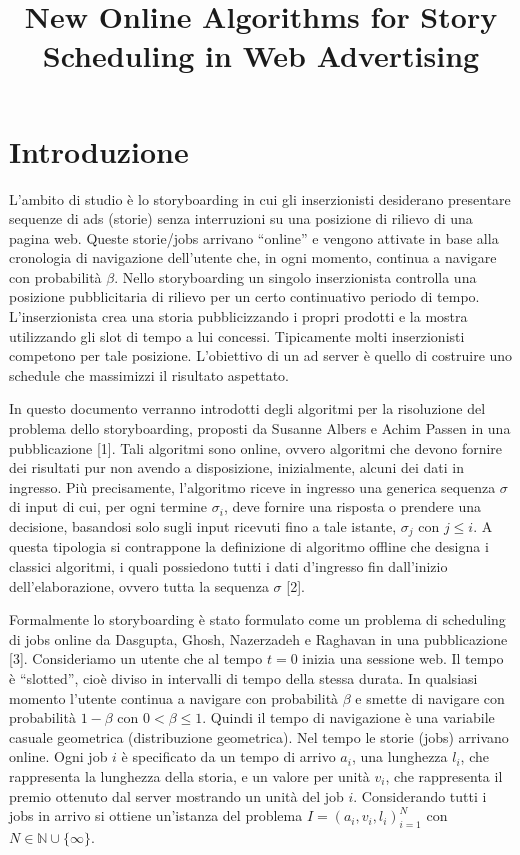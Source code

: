 \documentclass[12pt]{article}
\title{ \LARGE\textbf{New Online Algorithms for Story Scheduling in Web Advertising}}
\date{}
\newcommand*{\N}{\mathbb{N}}
\begin{document}
\maketitle
\section{Introduzione}
L’ambito di studio è lo storyboarding in cui gli inserzionisti desiderano presentare sequenze di ads (storie) senza interruzioni su una posizione di rilievo di una pagina web. Queste storie/jobs arrivano “online” e vengono attivate in base alla cronologia di navigazione dell'utente che, in ogni momento, continua a navigare con probabilità $\beta$. Nello storyboarding un singolo inserzionista controlla una posizione pubblicitaria di rilievo per un certo continuativo periodo di tempo. L’inserzionista crea una storia pubblicizzando i propri prodotti e la mostra utilizzando gli slot di tempo a lui concessi. Tipicamente molti inserzionisti competono per tale posizione. L’obiettivo di un ad server è quello di costruire uno schedule che massimizzi il risultato aspettato. 

In questo documento verranno introdotti degli algoritmi per la risoluzione del problema dello storyboarding, proposti da Susanne Albers e Achim Passen in una pubblicazione [1]. Tali algoritmi sono online, ovvero algoritmi che devono fornire dei risultati pur non avendo a disposizione, inizialmente, alcuni dei dati in ingresso. Più precisamente, l'algoritmo riceve in ingresso una generica sequenza $\sigma$ di input di cui, per ogni termine $\sigma_{i}$, deve fornire una risposta o prendere una decisione, basandosi solo sugli input ricevuti fino a tale istante, $\sigma_{j}$ con $j \leq i$. A questa tipologia si contrappone la definizione di algoritmo offline che designa i classici algoritmi, i quali possiedono tutti i dati d'ingresso fin dall'inizio dell'elaborazione, ovvero tutta la sequenza $\sigma$ [2].

Formalmente lo storyboarding è stato formulato come un problema di scheduling di jobs online da Dasgupta, Ghosh, Nazerzadeh e Raghavan in una pubblicazione [3]. Consideriamo un utente che al tempo $t = 0$ inizia una sessione web. Il tempo è “slotted”, cioè diviso in intervalli di tempo della stessa durata. In qualsiasi momento l’utente continua a navigare con probabilità $\beta$ e smette di navigare con probabilità $1 - \beta$ con $0 < \beta \leq 1$. Quindi il tempo di navigazione è una variabile casuale geometrica (distribuzione geometrica). Nel tempo le storie (jobs) arrivano online. Ogni job $i$ è specificato da un tempo di arrivo $a_{i}$, una lunghezza $l_{i}$, che rappresenta la lunghezza della storia, e un valore per unità $v_{i}$, che rappresenta il premio ottenuto dal server mostrando un unità del job $i$. Considerando tutti i jobs in arrivo si ottiene un'istanza del problema $I = (a_{i}, v_{i}, l_{i})_{i=1}^{N}$ con  $N \in \N \cup \{ \infty \}$.
\end{document}
